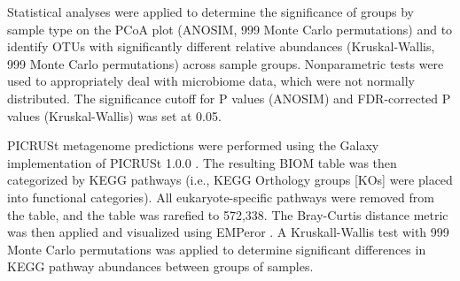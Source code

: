 Statistical analyses were applied to determine the significance of groups by sample
type on the PCoA plot (ANOSIM, 999 Monte Carlo permutations) and to identify OTUs
with significantly different relative abundances (Kruskal-Wallis, 999 Monte Carlo
permutations) across sample groups. Nonparametric tests were used to appropriately
deal with microbiome data, which were not normally distributed. The significance cutoff
for P values (ANOSIM) and FDR-corrected P values (Kruskal-Wallis) was set at 0.05.

PICRUSt metagenome predictions were performed using the Galaxy implementation of
PICRUSt 1.0.0 \cite{Langille2013}. The resulting BIOM table was then categorized
by KEGG pathways (i.e., KEGG Orthology groups [KOs] were placed into functional
categories). All eukaryote-specific pathways were removed from the table, and the
table was rarefied to 572,338. The Bray-Curtis distance metric was then applied
and visualized using EMPeror \cite{Vazquez-Baeza2013}. A Kruskall-Wallis test with
999 Monte Carlo permutations was applied to determine significant differences in
KEGG pathway abundances between groups of samples.

